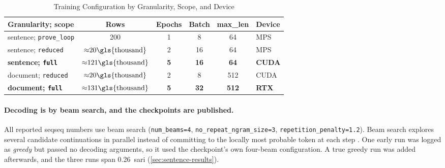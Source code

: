 \begin{table}[htbp]
	\centering
	\footnotesize
	\setlength{\tabcolsep}{4pt}
	\caption{Training Configuration by Granularity, Scope, and Device}
	\label{tab:training-config}
	\begin{tabular}{@{}lccccl@{}}
		\toprule
		\textbf{Granularity; scope}      & \textbf{Rows}                                           & \textbf{Epochs} & \textbf{Batch} & \textbf{max\_len} & \textbf{Device} \\
		\midrule
		sentence; \texttt{prove\_loop}   & 200                                                     & 1               & 8              & 64                & MPS             \\
		sentence; \texttt{reduced}       & \({\approx}20\text{\gls{thousand}}\)                    & 2               & 16             & 64                & MPS             \\
		\textbf{sentence; \texttt{full}} & \textbf{\boldmath\({\approx}121\text{\gls{thousand}}\)} & \textbf{5}      & \textbf{16}    & \textbf{64}       & \textbf{CUDA}   \\
		document; \texttt{reduced}       & \({\approx}20\text{\gls{thousand}}\)                    & 2               & 8              & 512               & CUDA            \\
		\textbf{document; \texttt{full}} & \textbf{\boldmath\({\approx}131\text{\gls{thousand}}\)} & \textbf{5}      & \textbf{32}    & \textbf{512}      & \textbf{RTX}    \\
		\bottomrule
	\end{tabular}
\end{table}

\paragraph{Decoding is by beam search, and the checkpoints are published.}
All reported \gls{seqseq} numbers use beam search (\texttt{num\_beams=4}, \texttt{no\_repeat\_ngram\_size=3}, \texttt{repetition\_penalty=1.2}).
Beam search explores several candidate continuations in parallel instead of committing to the locally most probable token at each step \parencite[224--225]{tunstall2023natural}.
One early run was logged as \emph{greedy} but passed no decoding arguments, so it used the checkpoint's own four-beam configuration.
A true greedy run was added afterwards, and the three runs span \num{0.26}~\gls{sari} (\cref{sec:sentence-results}).

